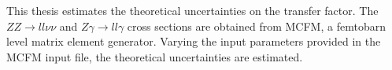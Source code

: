 \documentclass[11pt,a4paper,openright,twoside]{report}
\newcommand{\ZZ}{$ZZ\to ll\nu\nu$ }
\newcommand{\Zg}{$Z\gamma\to ll\gamma$ }
\begin{document}
This thesis estimates the theoretical uncertainties on the transfer factor. The \ZZ and \Zg cross sections are obtained from MCFM, a femtobarn level matrix element generator. Varying the input parameters provided in the MCFM input file, the theoretical uncertainties are estimated.

%
%
%
%
%
%
%
\end{document}
